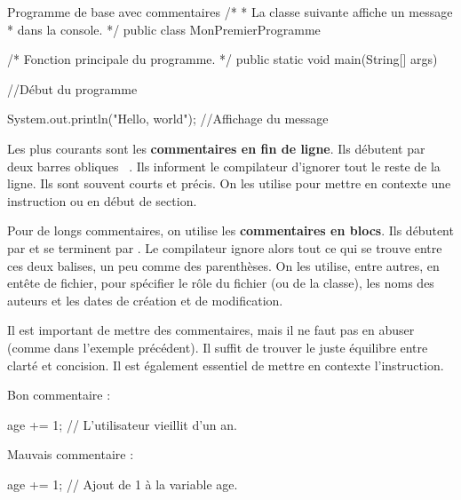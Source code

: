 \documentclass[12pt]{report}
\newcommand{\commande}[1]{%
\tcbox[on line, size=fbox, colframe=black, boxrule=0.75pt, tcbox raise base]{#1} %
}
\begin{document}
%
%
\begin{MyTCB}{Programme de base avec commentaires}
/* 
 * La classe suivante affiche un message
 * dans la console.
 */
public class MonPremierProgramme {

	/*  Fonction principale
		du programme.		*/
	public static void main(String[] args) {
	
		//Début du programme
		
		System.out.println("Hello, world"); //Affichage du message
		
	}
	
}
\end{MyTCB}
%
%
Les plus courants sont les \textbf{commentaires en fin de ligne}. Ils débutent par deux barres obliques \mbox{\commande{//}.} Ils informent le compilateur d'ignorer tout le reste de la ligne. Ils sont souvent courts et précis. On les utilise pour mettre en contexte une instruction ou en début de section.

Pour de longs commentaires, on utilise les \textbf{commentaires en blocs}. Ils débutent par \commande{/*} et se terminent par \commande{*/}. Le compilateur ignore alors tout ce qui se trouve entre ces deux balises, un peu comme des parenthèses. On les utilise, entre autres, en entête de fichier, pour spécifier le rôle du fichier (ou de la classe), les noms des auteurs et les dates de création et de modification.

Il est important de mettre des commentaires, mais il ne faut pas en abuser (comme dans l'exemple précédent). Il suffit de trouver le juste équilibre entre clarté et concision. Il est également essentiel de mettre en contexte l'instruction.

Bon commentaire :
\begin{code}
age += 1; // L'utilisateur vieillit d'un an.
\end{code}

Mauvais commentaire :
\begin{code}
age += 1; // Ajout de 1 à la variable age.
\end{code}


%
\end{document}
